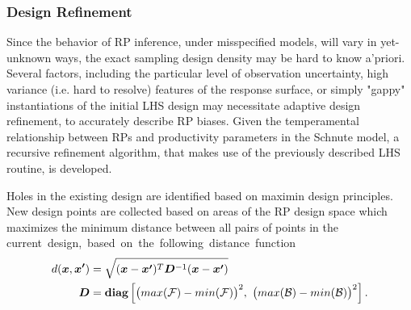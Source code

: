 \documentclass[12pt]{article}
\begin{document}



%
\subsubsection{Design Refinement}

%
Since the behavior of RP inference, under misspecified models, will vary in 
yet-unknown ways, the exact sampling design density may be hard to know a'priori. 
Several factors, including the particular level of observation uncertainty, 
high variance (i.e. hard to resolve) features of the response surface, or 
simply "gappy" instantiations of the initial LHS design may necessitate 
adaptive design refinement, to accurately describe RP biases. Given the 
temperamental relationship between RPs and productivity parameters in the Schnute 
model, a recursive refinement algorithm, that makes use of the previously 
described LHS routine, is developed. 

%
Holes in the existing design are identified based on maximin design principles.
New design points are collected based on areas of the RP design 
space which maximizes the minimum distance between all pairs of points in the 
\mbox{current design, based on the following distance function}
\begin{align}
d(\bm{x}, \bm{x'}) &= \sqrt{(\bm{x}-\bm{x'})^T\bm{D}^{-1}(\bm{x}-\bm{x'})}\\
\bm{D} &= \bm{\mbox{diag}\left[} \big(max(\mathcal{F})-min(\mathcal{F})\big)^2, ~\big(max(\mathcal{B})-min(\mathcal{B})\big)^2 \bm{\right]}. \nonumber
\end{align}
\end{document}
